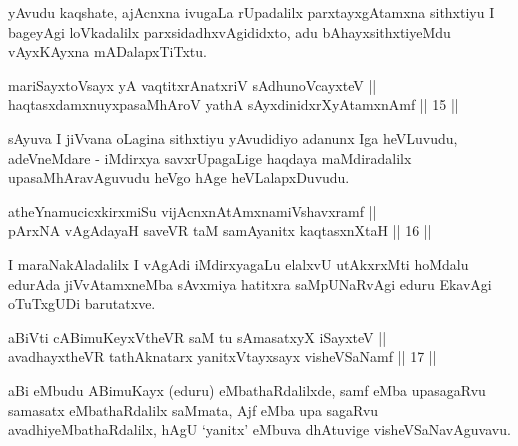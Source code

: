 \begin{artha}
yAvudu kaqshate, ajAcnxna ivugaLa rUpadalilx parxtayxgAtamxna
sithxtiyu I bageyAgi loVkadalilx parxsidadhxvAgididxto, adu
bAhayxsithxtiyeMdu vAyxKAyxna mADalapxTiTxtu.
\end{artha}


\begin{shl}
mariSayxtoV\s sayx yA vaqtitxrAnatxriV sA\s dhunoVcayxteV ||  \\
haqtasxdamxnuyxpasaMhAroV yathA sAyxdinidxrXyAtamxnAmf \hfill || 15 ||
  
\end{shl}

\begin{artha}
sAyuva I jiVvana oLagina sithxtiyu yAvudidiyo adanunx Iga heVLuvudu,
adeVneMdare - iMdirxya savxrUpagaLige haqdaya maMdiradalilx
upasaMhAravAguvudu heVgo hAge heVLalapxDuvudu.
\end{artha}


\begin{shl}
atheYnamucicxkirxmiSu vijAcnxnAtAmxnamiVshavxramf || \\
pArxNA vAgAdayaH saveVR taM samAyanitx kaqtasxnXtaH \hfill || 16 ||
  
\end{shl}

\begin{artha}
I maraNakAladalilx I vAgAdi iMdirxyagaLu elalxvU utAkxrxMti hoMdalu
edurAda jiVvAtamxneMba sAvxmiya hatitxra saMpUNaRvAgi eduru EkavAgi
oTuTxgUDi barutatxve.
\end{artha}


\begin{shl}
aBiVti cA\s \s BimuKeyxV\s theVR saM tu sAmasatxyX iSayxteV ||  \\
avadhayxtheVR tathA\s \s knatarx yanitxVtayxsayx visheVSaNamf \hfill || 17 ||
 
\end{shl}

\begin{artha}
aBi eMbudu ABimuKayx (eduru) eMbathaRdalilxde, samf eMba upasagaRvu
samasatx eMbathaRdalilx saMmata, Ajf eMba upa sagaRvu
avadhiyeMbathaRdalilx, hAgU `yanitx' eMbuva dhAtuvige visheVSaNavAguvavu.
\end{artha}

